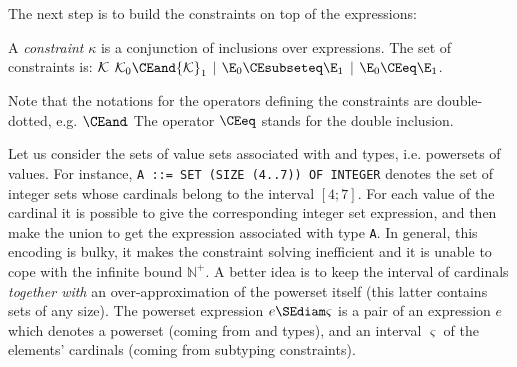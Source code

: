 The next step is to build the constraints on top of the expressions:

\begin{Def}[Constraints]\label{constraints_def}
A \emph{constraint} $\kappa$ is a conjunction of inclusions over
expressions. The set of constraints is:
${\cal K}$ \ASSIGN ${\cal K}_0 \CEand {\cal K}_1$
            $\mid$ $\E_0 \CEsubseteq \E_1$
            $\mid$ $\E_0 \CEeq \E_1$.
\end{Def}

Note that the notations for the operators defining the constraints are
double-dotted, e.g. $\CEand\!$. The operator $\CEeq$ stands for the
double inclusion.


Let us consider the sets of value sets associated with \kwdSETOF{} and
\kwdSEQUENCEOF{} types, i.e. powersets of values. For instance,
\texttt{\small A ::= SET (SIZE (4..7)) OF INTEGER} denotes the set of
integer sets whose cardinals belong to the interval $[4;7]$. For each
value of the cardinal it is possible to give the corresponding integer
set expression, and then make the union to get the expression
associated with type \texttt{\small A}. In general, this encoding is
bulky, it makes the constraint solving inefficient and it is unable
to cope with the infinite bound $\mathbb{N}^{+}\!$. A better idea is
to keep the interval of cardinals \emph{together with} an
over-approximation of the powerset itself (this latter contains sets
of any size). The powerset expression $e \SEdiam \varsigma$ is a pair
of an expression $e$ which denotes a powerset (coming from \kwdSETOF{}
and \kwdSEQUENCEOF{} types), and an interval $\varsigma$ of the
elements' cardinals (coming from \kwdSIZE{} subtyping constraints).


